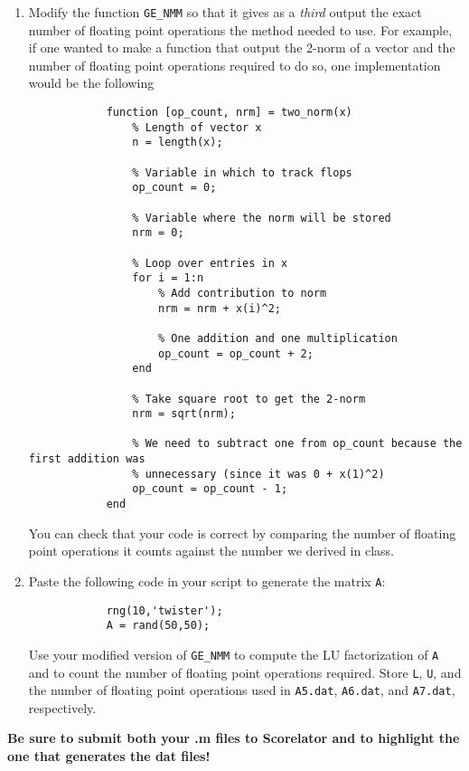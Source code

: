 \documentclass[]{article}
\begin{document}
\begin{enumerate}[resume]
\begin{enumerate}
		\item Modify the function \texttt{GE\_NMM} so that it gives as a \textit{third} output the exact number of floating point operations the method needed to use. For example, if one wanted to make a function that output the 2-norm of a vector and the number of floating point operations required to do so, one implementation would be the following
		\begin{verbatim}
			function [op_count, nrm] = two_norm(x)
			    % Length of vector x
			    n = length(x);
    
			    % Variable in which to track flops
			    op_count = 0;
    
			    % Variable where the norm will be stored
			    nrm = 0;
    
			    % Loop over entries in x
			    for i = 1:n
			        % Add contribution to norm
			        nrm = nrm + x(i)^2;
    
			        % One addition and one multiplication
			        op_count = op_count + 2;
			    end
    
			    % Take square root to get the 2-norm
			    nrm = sqrt(nrm);
    
			    % We need to subtract one from op_count because the first addition was
			    % unnecessary (since it was 0 + x(1)^2)
			    op_count = op_count - 1;
			end
		\end{verbatim}

		You can check that your code is correct by comparing the number of floating point operations it counts against the number we derived in class.

		\item Paste the following code in your script to generate the matrix \texttt{A}:
		\begin{verbatim}
			rng(10,'twister');
			A = rand(50,50);
		\end{verbatim}
		Use your modified version of \texttt{GE\_NMM} to compute the LU factorization of \texttt{A} and to count the number of floating point operations required. Store \texttt{L}, \texttt{U}, and the number of floating point operations used in \texttt{A5.dat}, \texttt{A6.dat}, and \texttt{A7.dat}, respectively.

	\end{enumerate}

	\textbf{Be sure to submit both your .m files to Scorelator and to highlight the one that generates the dat files!}

\end{enumerate}
\end{document}
